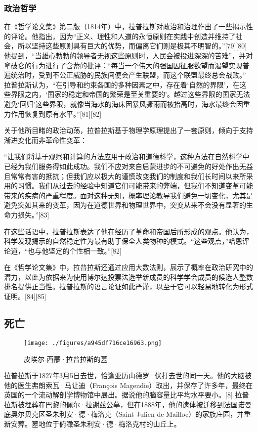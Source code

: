 \subsubsection{政治哲学}
在《哲学论文集》第二版（1814年）中，拉普拉斯对政治和治理作出了一些揭示性的评论。他指出，因为“正义、理性和人道的永恒原则在实践中创造并维持了社会，所以坚持这些原则具有巨大的优势，而偏离它们则是极其不明智的。”[79][80] 他提到，“当雄心勃勃的领导者无视这些原则时，人民会被投进深深的苦难”，并对拿破仑的行为进行了含蓄的批评：“每当一个伟大的强国因征服欲望而渴望实现普遍统治时，受到不公正威胁的民族间便会产生联盟，而这个联盟最终总会战败。” 拉普拉斯认为，“在引导和约束各国的多种因素之中，存在着‘自然的界限’，在这些界限之内，‘国家的稳定和帝国的繁荣是至关重要的’。越过这些界限的国家无法避免‘回归’这些界限，就像当海水的海床因暴风骤雨而被抬高时，海水最终会因重力作用恢复到原有水平。”[81][82]

关于他所目睹的政治动荡，拉普拉斯基于物理学原理提出了一套原则，倾向于支持渐进变化而非革命性变革：

“让我们将基于观察和计算的方法应用于政治和道德科学，这种方法在自然科学中已经为我们服务得如此成功。我们不应对来自启蒙进步的不可避免的好处作出无益且常常有害的抵抗；但我们应以极大的谨慎改变我们的制度和我们长时间以来所采用的习惯。我们从过去的经验中知道它们可能带来的弊端，但我们不知道变革可能带来的疾病的严重程度。面对这种无知，概率理论教导我们避免一切变化，尤其是避免突如其来的变革，因为在道德世界和物理世界中，突变从来不会没有显著的生命力损失。”[83]

在这些话语中，拉普拉斯表达了他在经历了革命和帝国后所形成的观点。他认为，科学发现揭示的自然稳定性为最有助于保全人类物种的模式。“这些观点，”哈恩评论道，“也与他坚定的个性相一致。”[82]

在《哲学论文集》中，拉普拉斯还通过应用大数法则，展示了概率在政治研究中的潜力，以此为依据来为使用博尔达投票法选举新成员的科学学会成员的候选人整数排名提供正当性。拉普拉斯的语言论证如此严谨，以至于它可以轻易地转化为形式证明。[84][85]
\subsection{死亡}
\begin{figure}[ht]
\centering
\texttt{[image: ./figures/a945df716ce16963.png]}
\caption{皮埃尔-西蒙·拉普拉斯的墓} \label{fig_LPLS_11}
\end{figure}
拉普拉斯于1827年3月5日去世，恰逢亚历山德罗·伏打去世的同一天。他的大脑被他的医生弗朗索瓦·马让迪（François Magendie）取出，并保存了许多年，最终在英国的一个流动解剖学博物馆中展出。据说他的脑容量比平均水平要小。[8] 拉普拉斯被埋葬在巴黎的佩尔·拉谢兹公墓，但在1888年，他的遗体被迁移到法国诺曼底奥尔贝克区圣朱利安·德·梅洛克（Saint Julien de Mailloc）的家族庄园，并重新安葬。墓地位于俯瞰圣朱利安·德·梅洛克村的山丘上。
